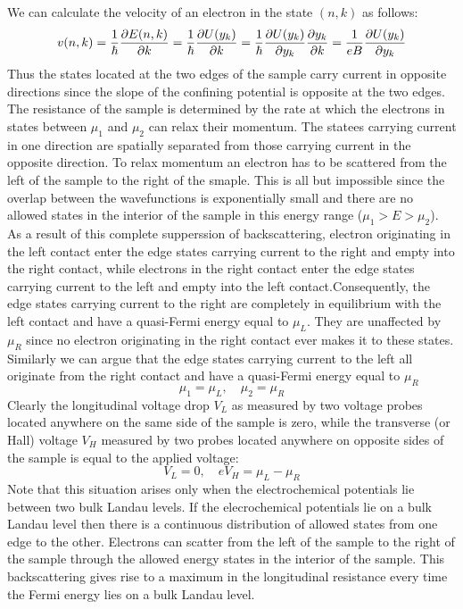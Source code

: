 \documentclass[11pt,a4paper]{book}
\theoremstyle{plain}
\theoremstyle{definition}
\theoremstyle{remark}
\begin{document}
We can calculate the velocity of an electron in the state $(n,k)$ as follows:
\begin{equation}
    v(n,k) = \frac{1}{\hbar} \pdv{E(n,k)}{k} = \frac{1}{\hbar} \pdv{U(y_k)}{k} = \frac{1}{\hbar} \pdv{U(y_k)}{y_k} \pdv{y_k}{k} = \frac{1}{e B} \pdv{U(y_k)}{y_k}
\end{equation}
Thus the states located at the two edges of the sample carry current in opposite directions since the slope of the confining potential is opposite at the two edges. The resistance of the sample is determined by the rate at which the electrons in states between $\mu_1$ and $\mu_2$ can relax their momentum. The statees carrying current in one direction are spatially separated from those carrying current in the opposite direction. To relax momentum an electron has to be scattered from the left of the sample to the right of the smaple. This is all but impossible since the overlap between the wavefunctions is exponentially small and there are no allowed states in the interior of the sample in this energy range ($\mu_1 > E > \mu_2$).
As a result of this complete supperssion of backscattering, electron originating in the left contact enter the edge states carrying current to the right and empty into the right contact, while electrons in the right contact enter the edge states carrying current to the left and empty into the left contact.Consequently, the edge states carrying current to the right are completely in equilibrium with the left contact and have a quasi-Fermi energy equal to $\mu_L$. They are unaffected by $\mu_R$ since no electron originating in the right contact ever makes it to these states. Similarly we can argue that the edge states carrying current to the left all originate from the right contact and have a quasi-Fermi energy equal to $\mu_R$
\begin{equation}
    \mu_1 = \mu_L, \quad \mu_2 = \mu_R
\end{equation}
Clearly the longitudinal voltage drop $V_L$ as measured by two voltage probes located anywhere on the same side of the sample is zero, while the transverse (or Hall) voltage $V_H$ measured by two probes located anywhere on opposite sides of the sample is equal to the applied voltage:
\begin{equation}
    V_L = 0, \quad eV_H = \mu_L - \mu_R
\end{equation}
Note that this situation arises only when the electrochemical potentials lie between two bulk Landau levels. If the elecrochemical potentials lie on a bulk Landau level then there is a continuous distribution of allowed states from one edge to the other. Electrons can scatter from the left of the sample to the right of the sample through the allowed energy states in the interior of the sample. This backscattering gives rise to a maximum in the longitudinal resistance every time the Fermi energy lies on a bulk Landau level.
\end{document}

